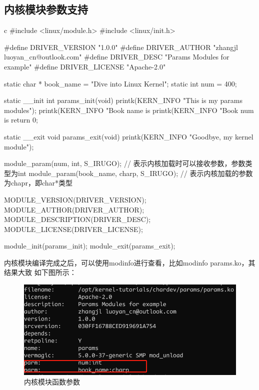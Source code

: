 \subsection{内核模块参数支持}
\begin{code-block}{c}
#include <linux/module.h>
#include <linux/init.h>

#define DRIVER_VERSION  "1.0.0"
#define DRIVER_AUTHOR   "zhangjl luoyan_cn@outlook.com"
#define DRIVER_DESC     "Params Modules for example"
#define DRIVER_LICENSE  "Apache-2.0"

static char * book_name = "Dive into Linux Kernel";
static int num = 400;

static __init int params_init(void)
{
        printk(KERN_INFO "This is my params modules\n");
        printk(KERN_INFO "Book name is %
        printk(KERN_INFO "Book num is %
        return 0;
}

static __exit void params_exit(void)
{
        printk(KERN_INFO "Goodbye, my kernel module\n");
}

module_param(num, int, S_IRUGO); // 表示内核加载时可以接收参数，参数类型为int
module_param(book_name, charp, S_IRUGO); // 表示内核加载的参数为chapr，即char*类型

MODULE_VERSION(DRIVER_VERSION);
MODULE_AUTHOR(DRIVER_AUTHOR);
MODULE_DESCRIPTION(DRIVER_DESC);
MODULE_LICENSE(DRIVER_LICENSE);

module_init(params_init);
module_exit(params_exit);
\end{code-block}

内核模块编译完成之后，可以使用modinfo进行查看，比如modinfo params.ko，其结果大致
如下图所示：
\begin{figure}[H]
  \centering
  \includegraphics[width=\linewidth]{params.png}
  \caption{内核模块函数参数}
  \label{fig:params}
\end{figure}


